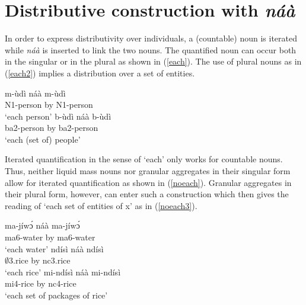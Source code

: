 \section{Distributive construction with {\itshape náà}} 
\label{sec:RedQUANT}



In order to express distributivity over individuals, a (countable) noun is iterated while {\itshape náà} is inserted to link the two nouns. %
The quantified noun can occur both in the singular or in the plural as shown in (\ref{each}). The use of plural nouns as in (\ref{each2}) implies a distribution over a set of entities.  

\begin{exe}
\ex\label{each}
\begin{xlist}
\ex\label{each1}
 \gll  m-ùdì  náà m-ùdì \\
          N1-person by N1-person  \\
    \trans `each person'
\ex \label{each2}
  \gll    b-ùdì  náà b-ùdì \\
             ba2-person by ba2-person \\
    \trans `each (set of) people'
\end {xlist}
\end {exe}

Iterated quantification in the sense of `each' only works for countable nouns. Thus, neither liquid mass nouns nor granular aggregates in their singular form allow for iterated quantification as shown in (\ref{noeach}). Granular aggregates in their plural form, however, can enter such a construction which then gives the reading of `each set of entities of x' as in (\ref{noeach3}).

\begin{exe}
\ex\label{noeach}
\begin{xlist}
\ex\label{noeach1}
 \gll  *ma-jíwɔ́ náà ma-jíwɔ́ \\
          ma6-water by ma6-water  \\
    \trans `each water'
\ex \label{noeach2}
  \gll    *ndísì náà ndísì \\
              $\emptyset$3.rice by nc3.rice \\
    \trans `each rice'
\ex \label{noeach3}
  \gll    mi-ndísì náà mi-ndísì \\
              mi4-rice by nc4-rice \\
    \trans `each set of packages of rice'
\end {xlist}
\end {exe}




